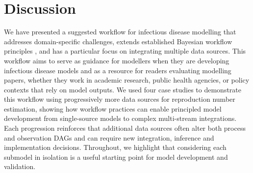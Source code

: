 \documentclass{article}
\begin{document}
\section{Discussion}
\label{sec:discuss}

We have presented a suggested workflow for infectious disease modelling that addresses domain-specific challenges, extends established Bayesian workflow principles \citep{green2003highly,gelman2020bayesian}, and has a particular focus on integrating multiple data sources.
This workflow aims to serve as guidance for modellers when they are developing infectious disease models and as a resource for readers evaluating modelling papers, whether they work in academic research, public health agencies, or policy contexts that rely on model outputs.
We used four case studies to demonstrate this workflow using progressively more data sources for reproduction number estimation, showing how workflow practices can enable principled model development from single-source models to complex multi-stream integrations.
Each progression reinforces that additional data sources often alter both process and observation \ac{DAG}s and can require new integration, inference and implementation decisions.
Throughout, we highlight that considering each submodel in isolation is a useful starting point for model development and validation.

\end{document}
